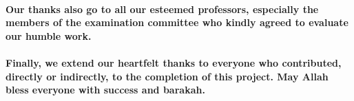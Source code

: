 \documentclass[a4paper,12pt]{report}
\begin{document}
\paragraph{Our thanks also go to all our esteemed professors, especially the members of the examination committee who kindly agreed to evaluate our humble work.}

\paragraph{Finally, we extend our heartfelt thanks to everyone who contributed, directly or indirectly, to the completion of this project. May Allah bless everyone with success and barakah.}

\newpage

\tableofcontents
\newpage

\listoffigures
\newpage

\listoftables
\newpage














% 




\end{document}
